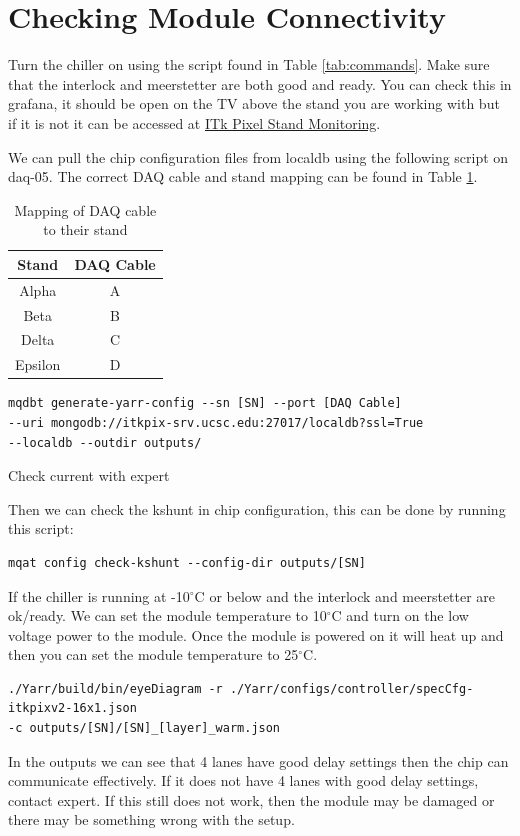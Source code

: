 \documentclass[12pt]{article}
\begin{document}
\newpage
\section{Checking Module Connectivity}
Turn the chiller on using the script found in Table \ref{tab:commands}. Make sure that the interlock and meerstetter are both good and ready. You can check this in grafana, it should be open on the TV above the stand you are working with but if it is not it can be accessed at \href{https://itkpix-srv.ucsc.edu/grafana/d/adsk2cnkdnda8b/itk-pixel-stand-monitoring?orgId=1&from=now-30m&to=now&timezone=browser&var-stand=ice-king&refresh=5s}{ITk Pixel Stand Monitoring}. 


We can pull the chip configuration files from localdb using the following script on daq-05. The correct DAQ cable and stand mapping can be found in Table \ref{tab:daqmap}.

\begin{table}[H]
    \centering
    \begin{tabular}{c|c}
        \hline 
        Stand & DAQ Cable \\
        \hline
        \hline
        Alpha & A\\
        Beta & B\\
        Delta & C\\
        Epsilon & D\\
        \hline
    \end{tabular}
    \caption{Mapping of DAQ cable to their stand}
    \label{tab:daqmap}
\end{table}

\begin{verbatim}
mqdbt generate-yarr-config --sn [SN] --port [DAQ Cable] 
--uri mongodb://itkpix-srv.ucsc.edu:27017/localdb?ssl=True 
--localdb --outdir outputs/
\end{verbatim}
Check current with expert

Then we can check the kshunt in chip configuration, this can be done by running this script:
\begin{verbatim}
mqat config check-kshunt --config-dir outputs/[SN]
\end{verbatim}

If the chiller is running at -10$^\circ$C or below and the interlock and meerstetter are ok/ready. We can set the module temperature to 10$^\circ$C and turn on the low voltage power to the module. Once the module is powered on it will heat up and then you can set the module temperature to 25$^\circ$C. 
\begin{verbatim}
./Yarr/build/bin/eyeDiagram -r ./Yarr/configs/controller/specCfg-itkpixv2-16x1.json 
-c outputs/[SN]/[SN]_[layer]_warm.json
\end{verbatim}
In the outputs we can see that 4 lanes have good delay settings then the chip can communicate effectively. If it does not have 4 lanes with good delay settings, contact expert. If this still does not work, then the module may be damaged or there may be something wrong with the setup. 
\end{document}
